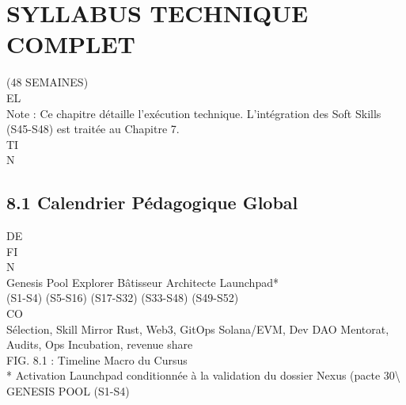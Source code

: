 \section{SYLLABUS TECHNIQUE COMPLET}
(48 SEMAINES)\\
\vspace{0.5em}
\vspace{0.5em}
\vspace{0.5em}
\vspace{0.5em}
EL\\
Note : Ce chapitre détaille l’exécution technique. L’intégration des Soft Skills (S45-S48) est traitée au Chapitre 7.\\
\vspace{0.5em}
\vspace{0.5em}
\vspace{0.5em}
\vspace{0.5em}
TI\\
N\\
\subsection{8.1 Calendrier Pédagogique Global}
\vspace{0.5em}
\vspace{0.5em}
\vspace{0.5em}
\vspace{0.5em}
DE\\
FI\\
N\\
Genesis Pool               Explorer                Bâtisseur            Architecte               Launchpad*\\
(S1-S4)                  (S5-S16)                (S17-S32)            (S33-S48)                 (S49-S52)\\
CO\\
Sélection, Skill Mirror   Rust, Web3, GitOps     Solana/EVM, Dev DAO   Mentorat, Audits, Ops   Incubation, revenue share\\
\vspace{0.5em}
\vspace{0.5em}
\vspace{0.5em}
FIG. 8.1 : Timeline Macro du Cursus\\
\vspace{0.5em}
* Activation Launchpad conditionnée à la validation du dossier Nexus (pacte 30\textbackslash{}%
\vspace{0.5em}
GENESIS POOL (S1-S4)\\
\vspace{0.5em}
